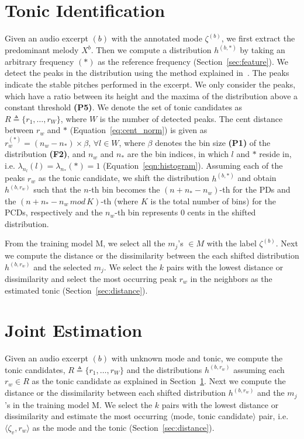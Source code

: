 \documentclass{sig-alternate}
\begin{document}
\section{Tonic Identification}\label{sec:tonic}

Given an audio excerpt $(b)$ with the annotated mode $\zeta^{(b)}$, we first extract the predominant melody $X^{b}$. Then we compute a distribution $h^{(b, *)}$ by taking an arbitrary frequency $(*)$ as the reference frequency (Section~\ref{sec:feature}). We detect the peaks in the distribution using the method explained in~\cite{smith1987parshl}. The peaks indicate the stable pitches performed in the excerpt. We only consider the peaks, which have a ratio between its height and the maxima of the distribution above a constant threshold {\bf (P5)}. We denote the set of tonic candidates as $R \triangleq \{r_1, \dots, r_W\}$, where $W$ is the number of detected peaks. The cent distance between $r_w$ and $*$ (Equation~\ref{eq:cent_norm}) is given as $r_w^{(*)} = \left(n_w - n_*\right) \times \beta,\,\forall l \in W$, where $\beta$ denotes the bin size {\bf (P1)} of the distribution {\bf (F2)}, and $n_w$ and $n_*$ are the bin indices, in which $l$ and $*$ reside in, i.e. $\lambda_{n_{l}}(l) = \lambda_{n_{*}}(*) = 1$ (Equation~\ref{eqn:histogram}). Assuming each of the peaks $r_w$ as the tonic candidate, we shift the distribution $h^{(b, *)}$ and obtain $h^{(b, r_w)}$ such that the $n$-th bin becomes the $(n + n_* - n_w)$-th for the PDs and the $(n + n_* - n_w \, mod \, K)$-th (where $K$ is the total number of bins) for the PCDs, respectively and the $n_w$-{th} bin represents $0$ cents in the shifted distribution.

From the training model M, we select all the $m_j$'s $\in M$ with the label $\zeta^{(b)}$. Next we compute the distance or the dissimilarity between the each shifted distribution $h^{(b, r_w)}$ and the selected $m_j$. We select the $k$ pairs with the lowest distance or dissimilarity and select the most occurring peak $r_w$ in the neighbors as the estimated tonic (Section~\ref{sec:distance}).

\section{Joint Estimation}\label{sec:joint}
Given an audio excerpt $(b)$ with unknown mode and tonic, we compute the tonic candidates, $R \triangleq \{r_1, \dots, r_W\}$ and the distributions $h^{(b, r_w)}$ assuming each $r_w \in R$ as the tonic candidate as explained in Section~\ref{sec:tonic}. Next we compute the distance or the dissimilarity between each shifted distribution $h^{(b, r_w)}$ and the $m_j$'s in the training model M. We select the $k$ pairs with the lowest distance or dissimilarity and estimate the most occurring $\langle$mode, tonic candidate$\rangle$ pair, i.e.  $\langle \zeta_v, r_w \rangle$ as the mode and the tonic (Section~\ref{sec:distance}).
\end{document}
